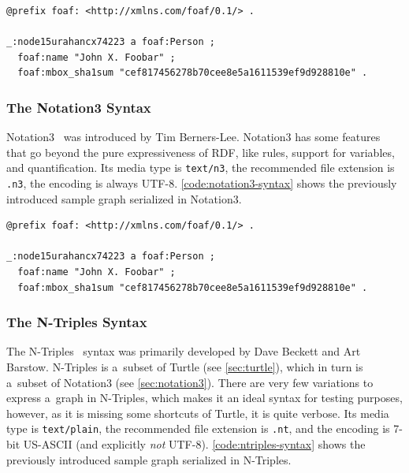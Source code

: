 \begin{lstlisting}[caption={A~sample graph in Turtle syntax,
  the syntax is equivalent to \autoref{code:notation3-syntax}.},
  label={code:turtle-syntax}]
@prefix foaf: <http://xmlns.com/foaf/0.1/> .

_:node15urahancx74223 a foaf:Person ;
  foaf:name "John X. Foobar" ;
  foaf:mbox_sha1sum "cef817456278b70cee8e5a1611539ef9d928810e" .
\end{lstlisting}

\subsubsection{The Notation3 Syntax} \label{sec:notation3}

Notation3~\cite{bernerslee2011notation3} was introduced
by Tim Berners-Lee.
Notation3 has some features that go beyond
the pure expressiveness of RDF, like rules,
support for variables, and quantification.
Its media type is \texttt{text/n3},
the recommended file extension is \texttt{.n3},
the encoding is always UTF-8.
\autoref{code:notation3-syntax} shows the previously
introduced sample graph serialized in Notation3.

\begin{lstlisting}[caption={A~sample graph in Notation3 syntax.},
  label={code:notation3-syntax}]
@prefix foaf: <http://xmlns.com/foaf/0.1/> .

_:node15urahancx74223 a foaf:Person ;
  foaf:name "John X. Foobar" ;
  foaf:mbox_sha1sum "cef817456278b70cee8e5a1611539ef9d928810e" .
\end{lstlisting}

\subsubsection{The N-Triples Syntax} \label{sec:n-triples}

The N-Triples~\cite{grant2004ntriples} syntax was primarily
developed by Dave Beckett and Art Barstow.
N-Triples is a~subset of Turtle (see \autoref{sec:turtle}),
which in turn is a~subset of Notation3
(see \autoref{sec:notation3}).
There are very few variations to express a~graph in N-Triples,
which makes it an ideal syntax for testing purposes, however,
as it is missing some shortcuts of Turtle, it is quite verbose.
Its media type is \texttt{text/plain}, the recommended file extension is \texttt{.nt},
and the encoding is 7-bit US-ASCII
(and explicitly \emph{not} UTF-8).
\autoref{code:ntriples-syntax} shows the previously
introduced sample graph serialized in N-Triples.

